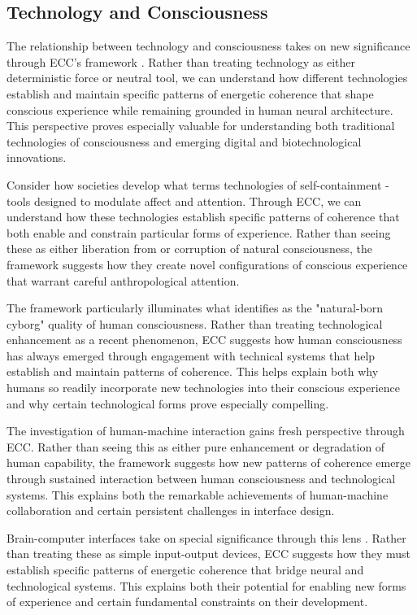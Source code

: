 \subsection{Technology and Consciousness}

The relationship between technology and consciousness takes on new significance through ECC's framework \cite{hayles2012how}. Rather than treating technology as either deterministic force or neutral tool, we can understand how different technologies establish and maintain specific patterns of energetic coherence that shape conscious experience while remaining grounded in human neural architecture. This perspective proves especially valuable for understanding both traditional technologies of consciousness and emerging digital and biotechnological innovations.

Consider how societies develop what \cite{turkle2011alone} terms technologies of self-containment - tools designed to modulate affect and attention. Through ECC, we can understand how these technologies establish specific patterns of coherence that both enable and constrain particular forms of experience. Rather than seeing these as either liberation from or corruption of natural consciousness, the framework suggests how they create novel configurations of conscious experience that warrant careful anthropological attention.

The framework particularly illuminates what \cite{clark2003natural} identifies as the "natural-born cyborg" quality of human consciousness. Rather than treating technological enhancement as a recent phenomenon, ECC suggests how human consciousness has always emerged through engagement with technical systems that help establish and maintain patterns of coherence. This helps explain both why humans so readily incorporate new technologies into their conscious experience and why certain technological forms prove especially compelling.

The investigation of human-machine interaction \cite{mindell2015our} gains fresh perspective through ECC. Rather than seeing this as either pure enhancement or degradation of human capability, the framework suggests how new patterns of coherence emerge through sustained interaction between human consciousness and technological systems. This explains both the remarkable achievements of human-machine collaboration and certain persistent challenges in interface design.

Brain-computer interfaces take on special significance through this lens \cite{clark2003natural}. Rather than treating these as simple input-output devices, ECC suggests how they must establish specific patterns of energetic coherence that bridge neural and technological systems. This explains both their potential for enabling new forms of experience and certain fundamental constraints on their development.

